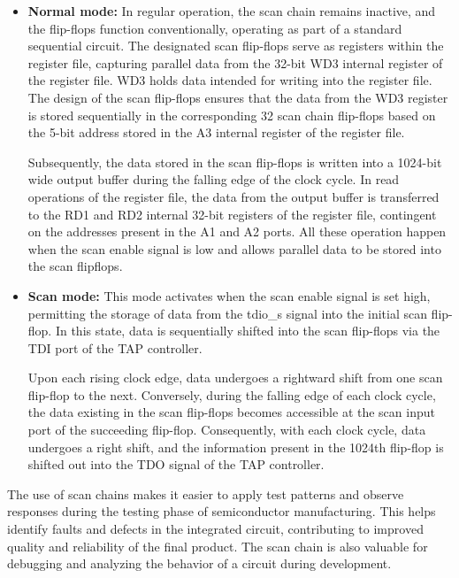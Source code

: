 \begin{itemize}
    \item \textbf{Normal mode: }In regular operation, the scan chain remains inactive, and the flip-flops function conventionally, operating as part of a standard sequential circuit. The designated scan flip-flops serve as registers within the register file, capturing parallel data from the 32-bit WD3 internal register of the register file. WD3 holds data intended for writing into the register file. The design of the scan flip-flops ensures that the data from the WD3 register is stored sequentially in the corresponding 32 scan chain flip-flops based on the 5-bit address stored in the A3 internal register of the register file.


    Subsequently, the data stored in the scan flip-flops is written into a 1024-bit wide output buffer during the falling edge of the clock cycle. In read operations of the register file, the data from the output buffer is transferred to the RD1 and RD2 internal 32-bit registers of the register file, contingent on the addresses present in the A1 and A2 ports. All these operation happen when the scan enable signal is low and allows parallel data to be stored into the scan flipflops.
    
\end{itemize}



\begin{itemize}
    \item \textbf{Scan mode: }This mode activates when the scan enable signal is set high, permitting the storage of data from the tdio\_s signal into the initial scan flip-flop. In this state, data is sequentially shifted into the scan flip-flops via the TDI port of the TAP controller.


    Upon each rising clock edge, data undergoes a rightward shift from one scan flip-flop to the next. Conversely, during the falling edge of each clock cycle, the data existing in the scan flip-flops becomes accessible at the scan input port of the succeeding flip-flop. Consequently, with each clock cycle, data undergoes a right shift, and the information present in the 1024th flip-flop is shifted out into the TDO signal of the TAP controller.
    
\end{itemize}
    The use of scan chains makes it easier to apply test patterns and observe responses during the testing phase of semiconductor manufacturing. This helps identify faults and defects in the integrated circuit, contributing to improved quality and reliability of the final product. The scan chain is also valuable for debugging and analyzing the behavior of a circuit during development.
\pagebreak
\newpage








